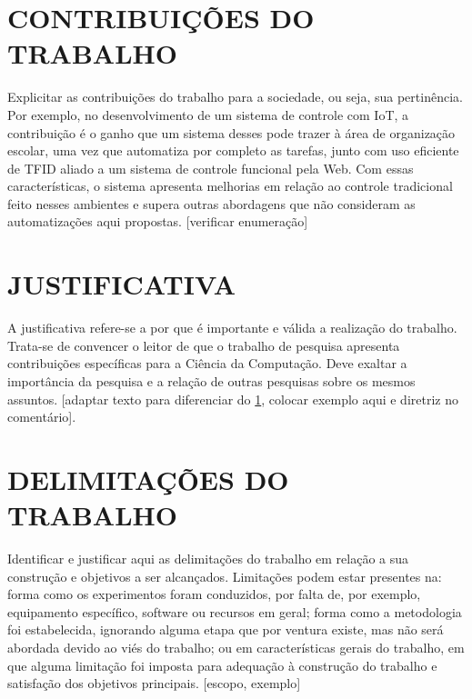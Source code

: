 \section{CONTRIBUIÇÕES DO TRABALHO}\label{sec:CONTRIBUICOES}
Explicitar as contribuições do trabalho para a sociedade, ou seja, sua pertinência. Por exemplo, no desenvolvimento de um sistema de controle com IoT, a contribuição é o ganho que um sistema desses pode trazer à área de organização escolar, uma vez que automatiza por completo as tarefas, junto com uso eficiente de TFID aliado a um sistema de controle funcional pela Web. Com essas características, o sistema apresenta melhorias em relação ao controle tradicional feito nesses ambientes e supera outras abordagens que não consideram as automatizações aqui propostas. [verificar enumeração]


\section{JUSTIFICATIVA}\label{sec:JUSTIFICATIVA}
A justificativa refere-se a por que é importante e válida a realização do trabalho. Trata-se de convencer o leitor de que o trabalho de pesquisa  apresenta contribuições específicas para a Ciência da Computação. Deve exaltar a importância da pesquisa e a relação de outras pesquisas sobre os mesmos assuntos. [adaptar texto para diferenciar do \ref{sec:CONTRIBUICOES}, colocar exemplo aqui e diretriz no comentário].


\section{DELIMITAÇÕES DO TRABALHO}\label{sec:DELIMITACOES}
Identificar e justificar aqui as delimitações do trabalho em relação a sua construção e objetivos a ser alcançados. Limitações podem estar presentes na: forma como os experimentos foram conduzidos, por falta de, por exemplo, equipamento específico, software ou recursos em geral; forma como a metodologia foi estabelecida, ignorando alguma etapa que por ventura existe, mas não será abordada devido ao viés do trabalho; ou em características gerais do trabalho, em que alguma limitação foi imposta para adequação à construção do trabalho e satisfação dos objetivos principais. [escopo, exemplo]
